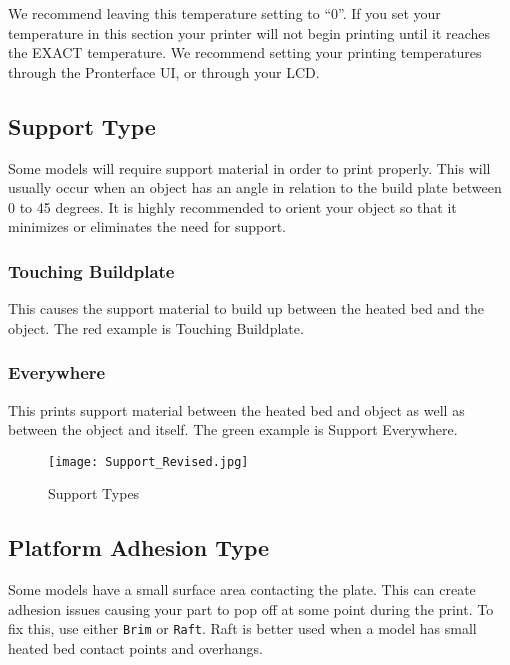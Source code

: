 We recommend leaving this temperature setting to “0”. If you set your temperature in this section your printer will not begin printing until it reaches the EXACT temperature. We recommend setting your printing temperatures through the Pronterface UI, or through your LCD.

\subsection{Support Type}
Some models will require support material in order to print properly. This will usually occur when an object has an angle in relation to the build plate between 0 to 45 degrees. It is highly recommended to orient your object so that it minimizes or eliminates the need for support.

\subsubsection{Touching Buildplate}
This causes the support material to build up between the heated bed and the object. The red example is Touching Buildplate.

\subsubsection{Everywhere}
This prints support material between the heated bed and object as well as between the object and itself. The green example is Support Everywhere.
\begin{figure}[H]
\centering
\texttt{[image: Support\_Revised.jpg]}
\caption{Support Types}
\label{fig:Different Types of Support}
\end{figure}

\subsection{Platform Adhesion Type}
Some models have a small surface area contacting the plate. This can create adhesion issues causing your part to pop off at some point during the print. To fix this, use either \texttt{Brim} or \texttt{Raft}. Raft is better used when a model has small heated bed contact points and overhangs.

